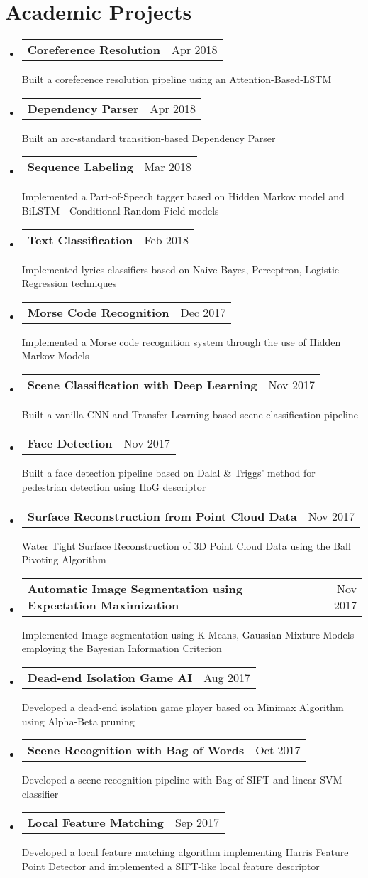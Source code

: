 \documentclass[letterpaper,11pt]{article}
\makeatletter
\newcommand{\resumeSubItem}[3]{
  \vspace{-1pt}\item[]
    \begin{tabular*}{0.97\textwidth}{l@{\extracolsep{\fill}}r}
      \textbf{\small#1} & {\small#2} \\
    \end{tabular*}
    {\small#3} \\
}
\newcommand{\resumeSubHeadingListStart}{\begin{itemize}[label={}, leftmargin=*]}
\newcommand{\resumeSubHeadingListEnd}{\end{itemize}}
\makeatother
\begin{document}
\section{Academic Projects}
  \resumeSubHeadingListStart  	
	\resumeSubItem{Coreference Resolution}{Apr 2018}{Built a coreference resolution pipeline using an Attention-Based-LSTM}
    \resumeSubItem{Dependency Parser}{Apr 2018}{Built an arc-standard transition-based Dependency Parser}
	\resumeSubItem{Sequence Labeling}{Mar 2018}{Implemented a Part-of-Speech tagger based on Hidden Markov model and BiLSTM - Conditional Random Field models}
	\resumeSubItem{Text Classification}{Feb 2018}{Implemented lyrics classifiers based on Naive Bayes, Perceptron, Logistic Regression techniques}
    \resumeSubItem{Morse Code Recognition}{Dec 2017} {Implemented a Morse code recognition system through the use of Hidden Markov Models}
    \resumeSubItem{Scene Classification with Deep Learning}{Nov 2017}{Built a vanilla CNN and Transfer Learning based scene classification pipeline}
    \resumeSubItem{Face Detection}{Nov 2017} {Built a face detection pipeline based on Dalal \& Triggs’ method for pedestrian detection using HoG descriptor}
    \resumeSubItem{Surface Reconstruction from Point Cloud Data}{Nov 2017} {Water Tight Surface Reconstruction of 3D Point Cloud Data using the Ball Pivoting Algorithm}
    \resumeSubItem{Automatic Image Segmentation using Expectation Maximization}{Nov 2017} {Implemented Image segmentation using K-Means, Gaussian Mixture Models employing the Bayesian Information Criterion}
    \resumeSubItem{Dead-end Isolation Game AI}{Aug 2017} {Developed a dead-end isolation game player based on Minimax Algorithm using Alpha-Beta pruning}
    \resumeSubItem{Scene Recognition with Bag of Words}{Oct 2017} {Developed a scene recognition pipeline with Bag of SIFT and linear SVM classifier}
    \resumeSubItem{Local Feature Matching}{Sep 2017} {Developed a local feature matching algorithm implementing Harris Feature Point Detector and implemented a SIFT-like local feature descriptor}
  \resumeSubHeadingListEnd
\end{document}
